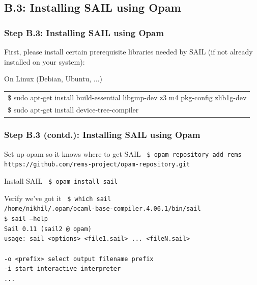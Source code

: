 \documentclass[aspectratio=169]{beamer}
\newcommand{\hm}{\hspace*{1em}}
\newcommand{\hmmm}{\hspace*{3em}}
\newcommand{\scripttt}{\scriptsize\tt}
\begin{document}

\subsection{B.3: Installing SAIL using Opam}

\begin{frame}
  \frametitle{Step B.3: Installing SAIL using Opam}

  First, please install certain prerequisite libraries needed by SAIL (if not already installed on your system):

  \begin{block}{On Linux (Debian, Ubuntu, ...)}
    \scripttt
    \begin{tabular}{l}
      \$ sudo apt-get install build-essential libgmp-dev z3 m4 pkg-config zlib1g-dev \\
      \$ sudo apt-get install device-tree-compiler \hmmm {\it Needed by simulator}
    \end{tabular}
  \end{block}

\end{frame}


\begin{frame}
  \frametitle{Step B.3 (contd.): Installing SAIL using Opam}

  \begin{block}{Set up opam so it knows where to get SAIL}
    {\scripttt
      \hm{}\$ opam repository add rems https://github.com/rems-project/opam-repository.git
    }
  \end{block}

  \begin{block}{Install SAIL}
    {\scripttt
      \hm{}\$ opam install sail \\
    }
  \end{block}

  \begin{block}{Verify we've got it}
    {\scripttt
      \hm{}\$ which sail \\
      \hm{}/home/nikhil/.opam/ocaml-base-compiler.4.06.1/bin/sail \\
      \hm{}\$ sail --help \\
      \hm{}Sail 0.11 (sail2 @ opam) \\
      \hm{}usage: sail <options> <file1.sail> ... <fileN.sail> \\
      \hm{} \\
      \hm{}  -o <prefix>                              select output filename prefix \\
      \hm{}  -i                                       start interactive interpreter \\
      \hm{}  ...
    }
  \end{block}

\end{frame}
\end{document}
